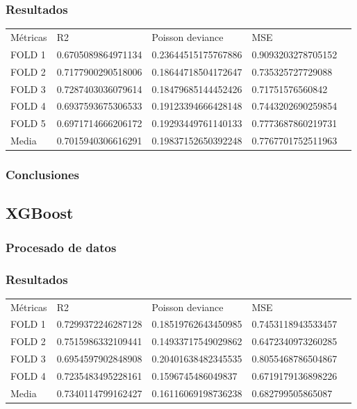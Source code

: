 \subsubsection{Resultados}
\begin{table}[htbp]
    \begin{tabular}{|l|l|l|l|l}
    \cline{1-4}
    Métricas & R2                 & Poisson deviance    & MSE                \\ \cline{1-4}
    FOLD 1   & 0.6705089864971134 & 0.23644515175767886 & 0.9093203278705152 \\ \cline{1-4}
    FOLD 2   & 0.7177900290518006 & 0.18644718504172647 & 0.735325727729088  \\ \cline{1-4}
    FOLD 3   & 0.7287403036079614 & 0.18479685144452426 & 0.71751576560842   \\ \cline{1-4}
    FOLD 4   & 0.6937593675306533 & 0.19123394666428148 & 0.7443202690259854 \\ \cline{1-4}
    FOLD 5   & 0.6971714666206172 & 0.19293449761140133 & 0.7773687860219731 \\ \cline{1-4}
    Media    & 0.7015940306616291 & 0.19837152650392248 & 0.7767701752511963 \\ \cline{1-4}
    \end{tabular}
\end{table}
\subsubsection{Conclusiones}

\subsection{XGBoost}
\subsubsection{Procesado de datos}
\subsubsection{Resultados}
\begin{table}[htbp]
    \begin{tabular}{|l|l|l|l|l}
    \cline{1-4}
    Métricas & R2                 & Poisson deviance     & MSE                \\ \cline{1-4}
    FOLD 1    & 0.7299372246287128 & 0.18519762643450985 & 0.7453118943533457 \\ \cline{1-4}
    FOLD 2    & 0.7515986332109441 & 0.14933717549029862 & 0.6472340973260285 \\ \cline{1-4}
    FOLD 3    & 0.6954597902848908 & 0.20401638482345535 & 0.8055468786504867 \\ \cline{1-4}
    FOLD 4    & 0.7235483495228161 & 0.1596745486049837  & 0.6719179136898226 \\ \cline{1-4}
    Media     & 0.7340114799162427 & 0.16116069198736238 & 0.682799505865087  \\ \cline{1-4}
\end{tabular}
\end{table}
